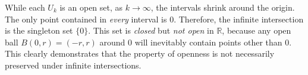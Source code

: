 \begin{math-stroke}
\begin{example}
\begin{center}
\end{center}
\begin{explanation-of-steps}
While each $U_k$ is an open set, as $k \to \infty$, the intervals shrink around the origin. The only point contained in \emph{every} interval is $0$. Therefore, the infinite intersection is the singleton set $\{0\}$. This set is \emph{closed} but \emph{not open} in $\mathbb{R}$, because any open ball $B(0, r) = (-r, r)$ around $0$ will inevitably contain points other than $0$. This clearly demonstrates that the property of openness is not necessarily preserved under infinite intersections.
\end{explanation-of-steps}
\end{example}
\end{math-stroke}

